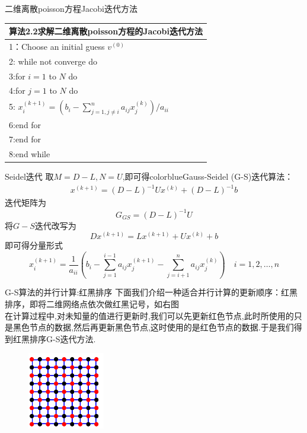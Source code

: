 \documentclass[notheorems,serif]{beamer}
\renewcommand{\normalsize}{\wuhao}
\newcommand{\wuhao}{\fontsize{10.5pt}{\baselineskip}\selectfont}
\begin{document}
\begin{frame}

{\color{blue}\Large 二维离散poisson方程Jacobi迭代方法}

\quad

\normalsize
\begin{tabular}{l}
\hline
{\color{blue}算法2.2}求解二维离散poisson方程的Jacobi迭代方法\\
\hline
1：Choose an initial guess $v^{(0)}$\\
2: while not converge do\\
3:\qquad for $i=1$ to $N$ do\\
4:\qquad \qquad for $j=1$ to $N$ do\\
5:\qquad \qquad \qquad
$
x_{i}^{(k+1)}=\left(b_{i}-\sum_{j=1, j \neq i}^{n} a_{i j} x_{j}^{(k)}\right) / a_{i i}
$\\
6:\qquad \qquad end for\\
7:\qquad end for\\
8:end while\\
\hline
\end{tabular}
\end{frame}


\begin{frame}
{Seidel迭代}
取$M=D-L,N=U$,即可得{color{blue}Gauss-Seidel (G-S)迭代}算法：
\begin{align}
x^{(k+1)}=(D-L)^{-1} U x^{(k)}+(D-L)^{-1} b\tag{6.9}
\end{align}
迭代矩阵为
$$
G_{GS}=(D-L)^{-1}U
$$
将$G-S$迭代改写为
$$
Dx^{(k+1)}=Lx^{(k+1)}+Ux^{(k)}+b
$$
即可得分量形式
$$
x_{i}^{(k+1)}=\frac{1}{a_{i i}}\left(b_{i}-\sum_{j=1}^{i-1} a_{i j} x_{j}^{(k+1)}-\sum_{j=i+1}^{n} a_{i j} x_{j}^{(k)}\right) \quad i=1,2, \ldots, n
$$
\end{frame}

\begin{frame}


{\color{blue}\Large G-S算法的并行计算:红黑排序}
\normalsize
下面我们介绍一种适合并行计算的更新顺序：{\color{blue}红黑排序}，即将二维网络点依次做红黑记号，如右图\\
	在计算过程中,对未知量的值进行更新时,我们可以先更新红色节点,此时所使用的只是黑色节点的数据,然后再更新黑色节点,这时使用的是红色节点的数据.于是我们得到红黑排序G-S迭代方法.
\begin{figure}[h]	
\includegraphics[width=0.3\textwidth]{figurest/figure_1.png} 
\end{figure}
\end{frame}
\end{document}
